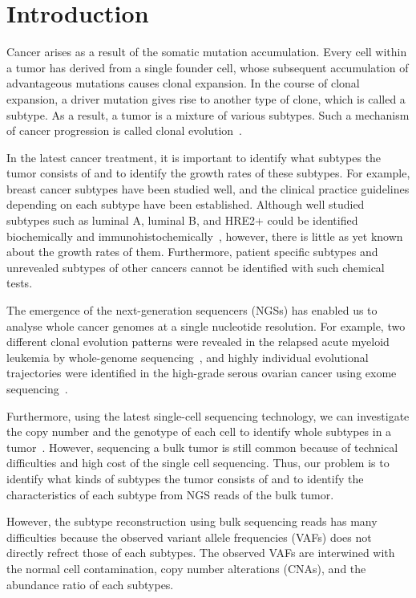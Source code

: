 \documentclass{article}
\begin{document}
\section{Introduction}
Cancer arises as a result of the somatic mutation accumulation. Every cell within a tumor has derived from a single founder cell, whose subsequent accumulation of advantageous mutations causes clonal expansion. In the course of clonal expansion, a driver mutation gives rise to another type of clone, which is called a subtype. As a result, a tumor is a mixture of various subtypes. Such a mechanism of cancer progression is called clonal evolution~\cite{nowell1976clonal}.

In the latest cancer treatment, it is important to identify what subtypes the tumor consists of and to identify the growth rates of these subtypes. For example, breast cancer subtypes have been studied well, and the clinical practice guidelines depending on each subtype have been established. Although well studied subtypes such as luminal A, luminal B, and HRE2+ could be identified biochemically and immunohistochemically~\cite{cancer2012comprehensive}, however, there is little as yet known about the growth rates of them. Furthermore, patient specific subtypes and unrevealed subtypes of other cancers cannot be identified with such chemical tests.

The emergence of the next-generation sequencers (NGSs) has enabled us to analyse whole cancer genomes at a single nucleotide resolution. For example, two different clonal evolution patterns were revealed in the relapsed acute myeloid leukemia by whole-genome sequencing~\cite{ding2012clonal}, and highly individual evolutional trajectories were identified in the high-grade serous ovarian cancer using exome sequencing~\cite{bashashati2013distinct}. %

Furthermore, using the latest single-cell sequencing technology, we can investigate the copy number and the genotype of each cell to identify whole subtypes in a tumor~\cite{navin2011tumour}. However, sequencing a bulk tumor is still common because of technical difficulties and high cost of the single cell sequencing. Thus, our problem is to identify what kinds of subtypes the tumor consists of and to identify the characteristics of each subtype from NGS reads of the bulk tumor.

However, the subtype reconstruction using bulk sequencing reads has many difficulties because the observed variant allele frequencies (VAFs) does not directly refrect those of each subtypes.
The observed VAFs are interwined with the normal cell contamination, copy number alterations (CNAs), and the abundance ratio of each subtypes.
\end{document}
